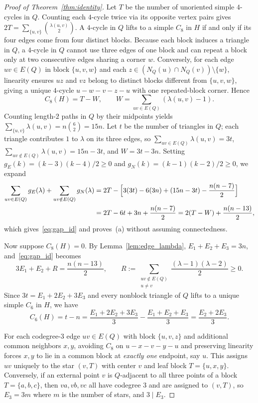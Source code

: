 \documentclass[11pt]{amsart}
\theoremstyle{definition}
\theoremstyle{remark}
\begin{document}
\begin{proof}[Proof of Theorem~\ref{thm:identity}]
Let $T$ be the number of unoriented simple $4$-cycles in $Q$. Counting each $4$-cycle twice via its opposite vertex pairs gives $2T = \sum_{\{u,v\}} \binom{\lambda(u,v)}{2}$. A $4$-cycle in $Q$ lifts to a simple $C_8$ in $H$ if and only if its four edges come from four distinct blocks. Because each block induces a triangle in $Q$, a $4$-cycle in $Q$ cannot use three edges of one block and can repeat a block only at two consecutive edges sharing a corner $w$. Conversely, for each edge $uv \in E(Q)$ in block $\{u,v,w\}$ and each $z \in (N_Q(u) \cap N_Q(v)) \setminus \{w\}$, linearity ensures $uz$ and $vz$ belong to distinct blocks different from $\{u,v,w\}$, giving a unique $4$-cycle $u-w-v-z-u$ with one repeated-block corner. Hence
\[
C_8(H) = T - W, \qquad W = \sum_{uv \in E(Q)} (\lambda(u,v) - 1).
\]
Counting length-$2$ paths in $Q$ by their midpoints yields $\sum_{\{u,v\}} \lambda(u,v) = n\binom{6}{2} = 15n$. Let $t$ be the number of triangles in $Q$; each triangle contributes $1$ to $\lambda$ on its three edges, so $\sum_{uv \in E(Q)} \lambda(u,v) = 3t$, $\sum_{uv \notin E(Q)} \lambda(u,v) = 15n - 3t$, and $W = 3t - 3n$. Setting $g_E(k) = (k-3)(k-4)/2 \ge 0$ and $g_N(k) = (k-1)(k-2)/2 \ge 0$, we expand
\begin{align*}
\sum_{uv \in E(Q)} g_E(\lambda) + \sum_{uv \notin E(Q)} g_N(\lambda)
&= 2T - \Bigl[ 3(3t) - 6(3n) + (15n - 3t) - \frac{n(n-7)}{2} \Bigr] \\
&= 2T - 6t + 3n + \frac{n(n-7)}{2} = 2(T - W) + \frac{n(n-13)}{2},
\end{align*}
which gives~\eqref{eq:gap_id} and proves~(a) without assuming connectedness.

Now suppose $C_8(H) = 0$. By Lemma~\ref{lem:edge_lambda}, $E_1 + E_2 + E_3 = 3n$, and~\eqref{eq:gap_id} becomes
\begin{equation}\label{eq:s_identity}
3E_1 + E_2 + R = \frac{n(n-13)}{2}, \qquad R := \sum_{\substack{uv \notin E(Q)\\ u \ne v}} \frac{(\lambda-1)(\lambda-2)}{2} \ge 0.
\end{equation}
Since $3t = E_1 + 2E_2 + 3E_3$ and every nonblock triangle of $Q$ lifts to a unique simple $C_6$ in $H$, we have
\[
C_6(H) = t - n = \frac{E_1 + 2E_2 + 3E_3}{3} - \frac{E_1 + E_2 + E_3}{3} = \frac{E_2 + 2E_3}{3}.
\]

For each codegree-$3$ edge $uv \in E(Q)$ with block $\{u,v,z\}$ and additional common neighbors $x, y$, avoiding $C_8$ on $u-x-v-y-u$ and preserving linearity forces $x, y$ to lie in a common block at \emph{exactly one} endpoint, say $u$. This assigns $uv$ uniquely to the star $(v, T)$ with center $v$ and leaf block $T = \{u,x,y\}$. Conversely, if an external point $v$ is $Q$-adjacent to all three points of a block $T=\{a,b,c\}$, then $va, vb, vc$ all have codegree $3$ and are assigned to $(v, T)$, so $E_3 = 3m$ where $m$ is the number of stars, and $3 \mid E_3$.


\end{proof}
\end{document}
